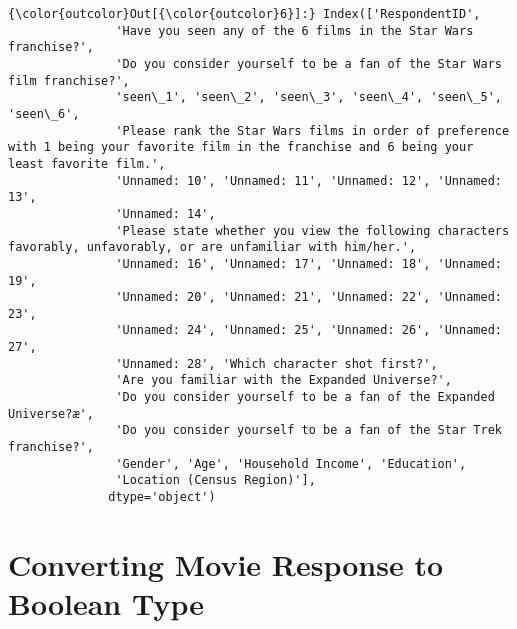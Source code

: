\documentclass[11pt]{article}
\begin{document}
\begin{Verbatim}[commandchars=\\\{\}]
{\color{outcolor}Out[{\color{outcolor}6}]:} Index(['RespondentID',
               'Have you seen any of the 6 films in the Star Wars franchise?',
               'Do you consider yourself to be a fan of the Star Wars film franchise?',
               'seen\_1', 'seen\_2', 'seen\_3', 'seen\_4', 'seen\_5', 'seen\_6',
               'Please rank the Star Wars films in order of preference with 1 being your favorite film in the franchise and 6 being your least favorite film.',
               'Unnamed: 10', 'Unnamed: 11', 'Unnamed: 12', 'Unnamed: 13',
               'Unnamed: 14',
               'Please state whether you view the following characters favorably, unfavorably, or are unfamiliar with him/her.',
               'Unnamed: 16', 'Unnamed: 17', 'Unnamed: 18', 'Unnamed: 19',
               'Unnamed: 20', 'Unnamed: 21', 'Unnamed: 22', 'Unnamed: 23',
               'Unnamed: 24', 'Unnamed: 25', 'Unnamed: 26', 'Unnamed: 27',
               'Unnamed: 28', 'Which character shot first?',
               'Are you familiar with the Expanded Universe?',
               'Do you consider yourself to be a fan of the Expanded Universe?æ',
               'Do you consider yourself to be a fan of the Star Trek franchise?',
               'Gender', 'Age', 'Household Income', 'Education',
               'Location (Census Region)'],
              dtype='object')
\end{Verbatim}
            
    \section{Converting Movie Response to Boolean
Type}\label{converting-movie-response-to-boolean-type}
\end{document}
